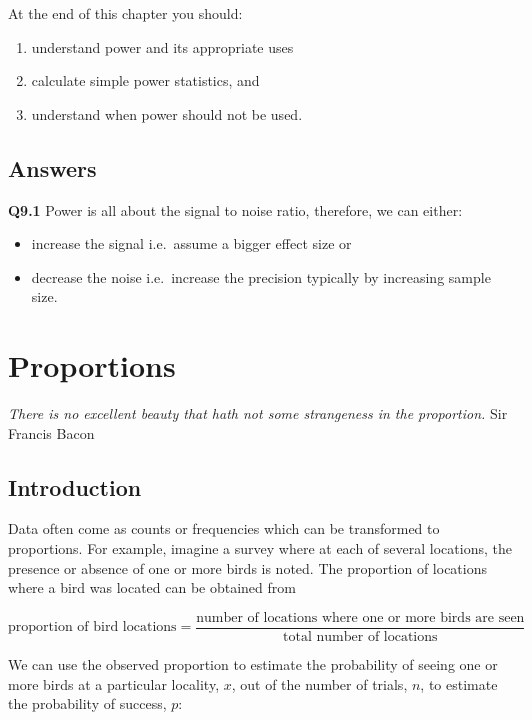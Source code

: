 \documentclass[
  oneside]{krantz}
\providecommand{\tightlist}{%
  \setlength{\itemsep}{0pt}\setlength{\parskip}{0pt}}
\begin{document}
At the end of this chapter you should:

\begin{enumerate}
\def\labelenumi{\arabic{enumi}.}
\tightlist
\item
  understand power and its appropriate uses
\item
  calculate simple power statistics, and
\item
  understand when power should not be used.
\end{enumerate}

\hypertarget{ANSpower}{%
\section{Answers}\label{ANSpower}}

\textbf{Q9.1} Power is all about the signal to noise ratio, therefore, we can either:

\begin{itemize}
\tightlist
\item
  increase the signal i.e.~assume a bigger effect size or
\item
  decrease the noise i.e.~increase the precision typically by increasing sample size.
\end{itemize}

\hypertarget{proportions}{%
\chapter{Proportions}\label{proportions}}

\emph{There is no excellent beauty that hath not some strangeness in the proportion.}
Sir Francis Bacon \citeyearpar{Bacon1696}

\hypertarget{INTprop}{%
\section{Introduction}\label{INTprop}}

Data often come as counts or frequencies which can be transformed to proportions. For example, imagine a survey where at each of several locations, the presence or absence of one or more birds is noted. The proportion of locations where a bird was located can be obtained from

\[\textrm{proportion of bird locations} = \frac{\textrm{number of locations where one or more birds are seen}}{\textrm{total number of locations}}\]

We can use the observed proportion to estimate the probability of seeing one or more birds at a particular locality, \(x\), out of the number of trials, \(n\), to estimate the probability of success, \(p\):
\end{document}
